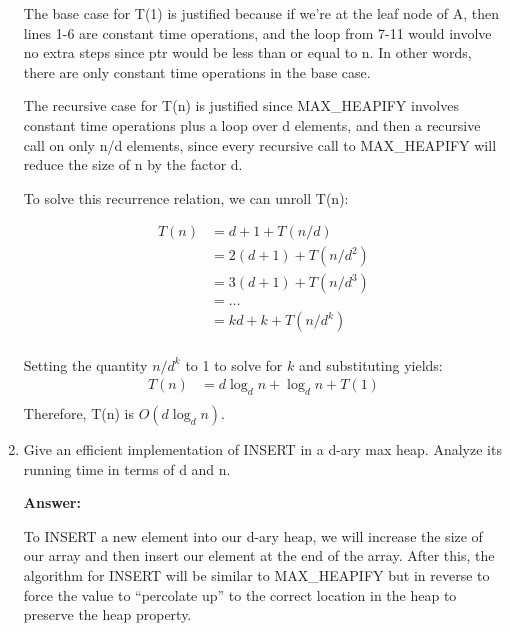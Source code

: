\documentclass[]{book}
\theoremstyle{definition}
\begin{document}
\begin{enumerate}
    The base case for T(1) is justified because if we're at the leaf node of A, then
    lines 1-6 are constant time operations, and the loop from 7-11 would involve
    no extra steps since ptr would be less than or equal to n. In other words, 
    there are only constant time operations in the base case.

    The recursive case for T(n) is justified since MAX\_HEAPIFY involves constant
    time operations plus a loop over d elements, and then a recursive call
    on only n/d elements, since every recursive call to MAX\_HEAPIFY will 
    reduce the size of n by the factor d.

    To solve this recurrence relation, we can unroll T(n):

    \begin{align*}
        T(n) &= d + 1 + T(n/d) \\
             &= 2(d + 1) + T(n/d^2) \\
             &= 3(d + 1) + T(n/d^3) \\
             &= \dots \\
             &= kd + k + T(n/d^k) \\
    \end{align*}

    Setting the quantity $n/d^k$ to 1 to solve for $k$ and substituting yields:
    \begin{align*}
        T(n) &= d \log_d n + \log_d n + T(1) \\
    \end{align*}
    Therefore, T(n) is $O(d \log_d n)$.


    \item Give an efficient implementation of INSERT in a d-ary max heap. Analyze its running time in terms of d and n.

    \textbf{Answer:} 
    
    To INSERT a new element into our d-ary heap, we will increase the size of our array and then insert
    our element at the end of the array. After this, the algorithm for INSERT will be similar to MAX\_HEAPIFY
    but in reverse to force the value to ``percolate up'' to the correct location in the heap to preserve
    the heap property.


\end{enumerate}
\end{document}
